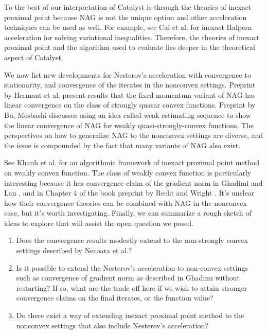\documentclass[12pt]{article}
\begin{document}
            To the best of our interpretation of Catalyst is through the theories of inexact proximal point because NAG is not the unique option and other acceleration techniques can be used as well. 
            For example, see Cai et al. \cite{cai_variance_2023} for inexact Halpern acceleration for solving variational inequalities. 
            Therefore, the theories of inexact proximal point and the algorithm used to evaluate lies deeper in the theoretical aspect of Catalyst. 
            \par
            We now list new developments for Nesterov's acceleration with convergence to stationarity, and convergence of the iterates in the nonconvex settings.
            Preprint by Hermant et al. \cite{hermant_study_2024} present results that the fixed momentum variant of NAG has linear convergence  on the class of strongly quasar convex functions. 
            Preprint by Bu, Mesbashi \cite{bu_note_2020} discusses using an idea called weak estimating sequence to show the linear convergence of NAG for weakly quasi-strongly-convex functions. 
            The perspectives on how to generalize NAG to the nonconvex settings are diverse, and the issue is compounded by the fact that many variants of NAG also exist. 
            \par
            See Khanh et al. \cite{khanh_inexact_2025} for an algorithmic framework of inexact proximal point method on weakly convex function. 
            The class of weakly convex function is particularly interesting because it has convergence claim of the gradient norm in Ghadimi and Lan \cite{ghadimi_accelerated_2016}, and in Chapter 4 of the book preprint by Recht and Wright \cite{recht_optimization_nodate}. 
            It's unclear how their convergence theories can be combined with NAG in the nonconvex case, but it's worth investigating. 
            Finally, we can summarize a rough sketch of ideas to explore that will assist the open question we posed. 
            \begin{enumerate}
                \item Does the convergence results modestly extend to the non-strongly convex settings described by Necoara \cite{necoara_linear_2019} et al.? 
                \item Is it possible to extend the Nesterov's acceleration to non-convex settings such as convergence of gradient norm as described in Ghadimi \cite{ghadimi_accelerated_2016} without restarting? If so, what are the trade off here if we wish to attain stronger convergence claims on the final iterates, or the function value? 
                \item Do there exist a way of extending inexact proximal point method to the nonconvex settings that also include Nesterov's acceleration? 
            \end{enumerate}
\end{document}
